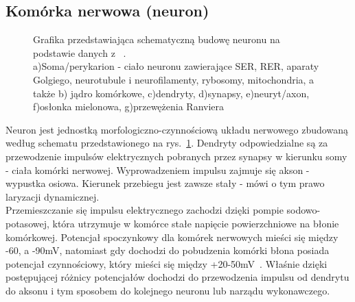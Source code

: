 \documentclass[twoside,a4paper]{book}
\begin{document}
\subsection{Komórka nerwowa (neuron)}
\begin{figure}[!h]

		\centering		
		\caption{Grafika przedstawiająca schematyczną budowę neuronu na podstawie danych z ~\cite{neurology}.\\ 
		a)Soma/perykarion - ciało neuronu zawierające SER, RER, aparaty Golgiego, neurotubule i neurofilamenty, rybosomy, mitochondria, a także b) jądro komórkowe, c)dendryty, d)synapsy, e)neuryt/axon, f)osłonka mielonowa, g)przewężenia Ranviera  }
		\label{fig:neuron}
	\end{figure}
	Neuron jest jednostką morfologiczno-czynnościową układu nerwowego zbudowaną według schematu przedstawionego na  rys.~\ref{fig:neuron}. Dendryty odpowiedzialne są za przewodzenie impulsów elektrycznych pobranych przez synapsy w kierunku somy - ciała komórki nerwowej. Wyprowadzeniem impulsu zajmuje się akson - wypustka osiowa. Kierunek przebiegu jest zawsze stały  - mówi o tym prawo laryzacji dynamicznej. ~\cite{anatomy}\\ 
Przemieszczanie się impulsu elektrycznego zachodzi dzięki pompie sodowo-potasowej, która utrzymuje w komórce stałe napięcie powierzchniowe na błonie komórkowej. Potencjał spoczynkowy dla komórek nerwowych mieści się między -60, a -90mV, natomiast gdy dochodzi do pobudzenia komórki błona posiada potencjał czynnościowy, który mieści się między +20-50mV~\cite{neurology}. Właśnie dzięki postępującej różnicy potencjałów dochodzi do przewodzenia impulsu od dendrytu do aksonu i tym sposobem do kolejnego neuronu lub narządu wykonawczego.
\end{document}
